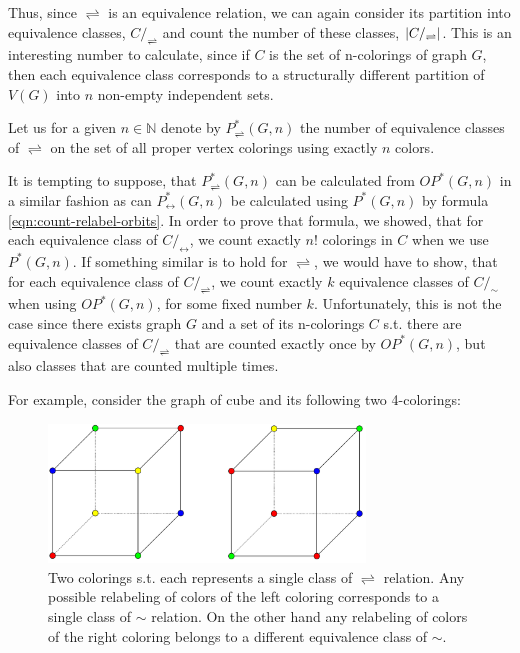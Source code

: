 Thus, since $\rightleftharpoons$ is an equivalence relation, we can again consider its partition into equivalence classes, $C/_\rightleftharpoons$ and count the number of these classes, $\left|{C/_\rightleftharpoons}\right|$. This is an interesting number to calculate, since if $C$ is the set of n-colorings of graph $G$, then each equivalence class corresponds to a structurally different partition of $V(G)$ into $n$ non-empty independent sets.

\begin{defn}
    Let us for a given $n \in \mathbb{N}$ denote by $P^*_{\rightleftharpoons}(G,n)$ the number of equivalence classes of $\rightleftharpoons$ on the set of all proper vertex colorings using exactly $n$ colors. 
\end{defn}

It is tempting to suppose, that $P^*_{\rightleftharpoons}(G,n)$ can be calculated from $OP^*(G,n)$ in a similar fashion as can $P^*_{\leftrightarrow}(G,n)$ be calculated using $P^*(G,n)$ by formula \ref{eqn:count-relabel-orbits}. In order to prove that formula, we showed, that for each equivalence class of $C/_\leftrightarrow$, we count exactly $n!$ colorings in $C$ when we use $P^*(G,n)$. If something similar is to hold for $\rightleftharpoons$, we would have to show, that for each equivalence class of $C/_\rightleftharpoons$, we count exactly $k$ equivalence classes of $C/_\sim$ when using $OP^*(G,n)$, for some fixed number $k$. Unfortunately, this is not the case since there exists graph $G$ and a set of its n-colorings $C$ s.t. there are equivalence classes of $C/_\rightleftharpoons$ that are counted exactly once by $OP^*(G,n)$, but also classes that are counted multiple times.

For example, consider the graph of cube and its following two 4-colorings:

\begin{figure}[H]
    \centering
    \includegraphics[width=0.75\textwidth]{Resources/Figs/example_diff_rel-aut_class_sizes.pdf}
    \caption{Two colorings s.t. each represents a single class of $\rightleftharpoons$ relation. Any possible relabeling of colors of the left coloring corresponds to a single class of $\sim$ relation. On the other hand any relabeling of colors of the right coloring belongs to a different equivalence class of $\sim$.}
    \label{fig:example-cube-4-clrings-diff-classes}
\end{figure}

